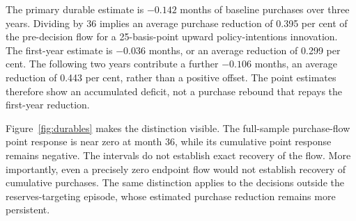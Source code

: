 \documentclass[11pt,a4paper]{article}
\begin{document}
The primary durable estimate is $-0.142$ months of baseline purchases over three years. Dividing by 36 implies an average purchase reduction of 0.395 per cent of the pre-decision flow for a 25-basis-point upward policy-intentions innovation. The first-year estimate is $-0.036$ months, or an average reduction of 0.299 per cent. The following two years contribute a further $-0.106$ months, an average reduction of 0.443 per cent, rather than a positive offset. The point estimates therefore show an accumulated deficit, not a purchase rebound that repays the first-year reduction.

Figure~\ref{fig:durables} makes the distinction visible. The full-sample purchase-flow point response is near zero at month 36, while its cumulative point response remains negative. The intervals do not establish exact recovery of the flow. More importantly, even a precisely zero endpoint flow would not establish recovery of cumulative purchases. The same distinction applies to the decisions outside the reserves-targeting episode, whose estimated purchase reduction remains more persistent.
\end{document}
